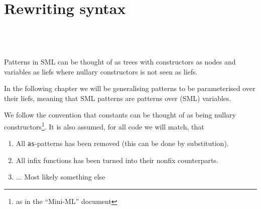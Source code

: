 \chapter{Rewriting syntax}

 \ \\

 \ \\

 \ \\

Patterns in SML can be thought of as trees with constructors as nodes and
variables as liefs where nullary constructors is not seen as liefs.

In the following chapter we will be generalising patterns to be parameterised
over their liefs, meaning that SML patterns are patterns over (SML) variables.

We follow the convention that constants can be thought of as being nullary
constructors\footnote{as in the ``Mini-ML'' document}. It is also assumed, for all code we will match, that

\begin{enumerate}
\item All \texttt{as}-patterns has been removed (this can be done by
  substitution).

\item All infix functions has been turned into their nonfix counterparts.

\item ... Most likely something else 
\end{enumerate}










